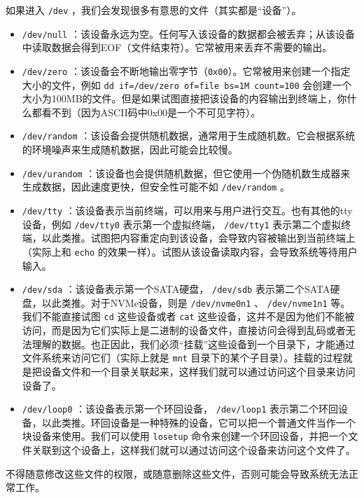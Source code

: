 如果进入 \texttt{/dev} ，我们会发现很多有意思的文件（其实都是“设备”）。
\begin{itemize}
  \item \texttt{/dev/null} ：该设备永远为空。任何写入该设备的数据都会被丢弃；从该设备中读取数据会得到EOF（文件结束符）。它常被用来丢弃不需要的输出。
  \item \texttt{/dev/zero} ：该设备会不断地输出零字节（\texttt{0x00}）。它常被用来创建一个指定大小的文件，例如 \texttt{dd if=/dev/zero of=file bs=1M count=100} 会创建一个大小为100MB的文件。但是如果试图直接把该设备的内容输出到终端上，你什么都看不到（因为ASCII码中0x00是一个不可见字符）。
  \item \texttt{/dev/random} ：该设备会提供随机数据，通常用于生成随机数。它会根据系统的环境噪声来生成随机数据，因此可能会比较慢。
  \item \texttt{/dev/urandom} ：该设备也会提供随机数据，但它使用一个伪随机数生成器来生成数据，因此速度更快，但安全性可能不如 \texttt{/dev/random} 。
  \item \texttt{/dev/tty} ：该设备表示当前终端，可以用来与用户进行交互。也有其他的tty设备，例如 \texttt{/dev/tty0} 表示第一个虚拟终端， \texttt{/dev/tty1} 表示第二个虚拟终端，以此类推。试图把内容重定向到该设备，会导致内容被输出到当前终端上（实际上和 \texttt{echo} 的效果一样）。试图从该设备读取内容，会导致系统等待用户输入。
  \item \texttt{/dev/sda} ：该设备表示第一个SATA硬盘， \texttt{/dev/sdb} 表示第二个SATA硬盘，以此类推。对于NVMe设备，则是 \texttt{/dev/nvme0n1} 、 \texttt{/dev/nvme1n1} 等。我们不能直接试图 \texttt{cd} 这些设备或者 \texttt{cat} 这些设备，这并不是因为他们不能被访问，而是因为它们实际上是二进制的设备文件，直接访问会得到乱码或者无法理解的数据。也正因此，我们必须“挂载”这些设备到一个目录下，才能通过文件系统来访问它们（实际上就是 \texttt{mnt} 目录下的某个子目录）。挂载的过程就是把设备文件和一个目录关联起来，这样我们就可以通过访问这个目录来访问设备了。
  \item \texttt{/dev/loop0} ：该设备表示第一个环回设备， \texttt{/dev/loop1} 表示第二个环回设备，以此类推。环回设备是一种特殊的设备，它可以把一个普通文件当作一个块设备来使用。我们可以使用 \texttt{losetup} 命令来创建一个环回设备，并把一个文件关联到这个设备上，这样我们就可以通过访问这个设备来访问这个文件了。
\end{itemize}

\begin{warning}
  不得随意修改这些文件的权限，或随意删除这些文件，否则可能会导致系统无法正常工作。
\end{warning}

